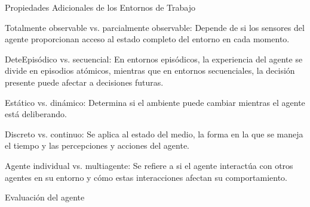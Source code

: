 \noindent \textcolor{Contraste4}{Propiedades Adicionales de los Entornos de Trabajo}\\

\begin{myitemize}
    \item Totalmente observable vs. parcialmente observable: Depende de si los sensores del agente proporcionan acceso al estado completo del entorno en cada momento.
    \item DeteEpisódico vs. secuencial: En entornos episódicos, la experiencia del agente se divide en episodios atómicos, mientras que en entornos secuenciales, la decisión presente puede afectar a decisiones futuras.
    \item Estático vs. dinámico: Determina si el ambiente puede cambiar mientras el agente está deliberando.
    \item Discreto vs. continuo: Se aplica al estado del medio, la forma en la que se maneja el tiempo y las percepciones y acciones del agente.
    \item Agente individual vs. multiagente: Se refiere a si el agente interactúa con otros agentes en su entorno y cómo estas interacciones afectan su comportamiento.
\end{myitemize}


\noindent \textcolor{Contraste4}{Evaluación del agente}\\

